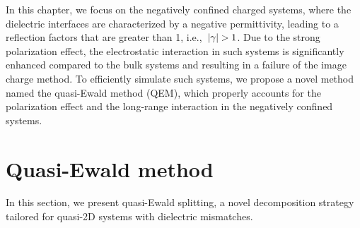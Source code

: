 In this chapter, we focus on the negatively confined charged systems, where the dielectric interfaces are characterized by a negative permittivity, leading to a reflection factors that are greater than 1, i.e.,~$\lvert\gamma\rvert > 1$.
Due to the strong polarization effect, the electrostatic interaction in such systems is significantly enhanced compared to the bulk systems and resulting in a failure of the image charge method.
To efficiently simulate such systems, we propose a novel method named the quasi-Ewald method (QEM), which properly accounts for the polarization effect and the long-range interaction in the negatively confined systems.

\section{Quasi-Ewald method}

In this section, we present quasi-Ewald splitting, a novel decomposition strategy tailored for quasi-2D systems with dielectric mismatches. 
